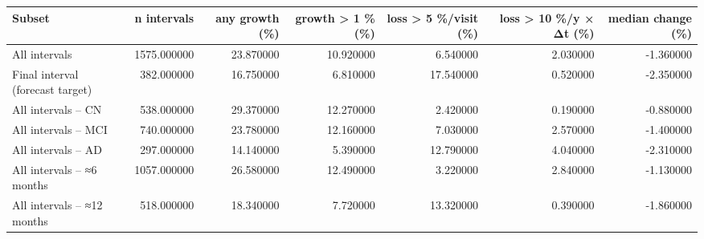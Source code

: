 \begin{tabular}{lrrrrrr}
\toprule
Subset & n intervals & any growth (\%) & growth > 1 \% (\%) & loss > 5 \%/visit (\%) & loss > 10 \%/y × Δt (\%) & median change (\%) \\
\midrule
All intervals & 1575.000000 & 23.870000 & 10.920000 & 6.540000 & 2.030000 & -1.360000 \\
Final interval (forecast target) & 382.000000 & 16.750000 & 6.810000 & 17.540000 & 0.520000 & -2.350000 \\
All intervals – CN & 538.000000 & 29.370000 & 12.270000 & 2.420000 & 0.190000 & -0.880000 \\
All intervals – MCI & 740.000000 & 23.780000 & 12.160000 & 7.030000 & 2.570000 & -1.400000 \\
All intervals – AD & 297.000000 & 14.140000 & 5.390000 & 12.790000 & 4.040000 & -2.310000 \\
All intervals – ≈6 months & 1057.000000 & 26.580000 & 12.490000 & 3.220000 & 2.840000 & -1.130000 \\
All intervals – ≈12 months & 518.000000 & 18.340000 & 7.720000 & 13.320000 & 0.390000 & -1.860000 \\
\bottomrule
\end{tabular}

